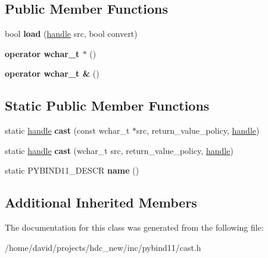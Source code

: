 \subsection*{Public Member Functions}
\begin{DoxyCompactItemize}
\item 
bool {\bfseries load} (\hyperlink{classhandle}{handle} src, bool convert)\hypertarget{classtype__caster_3_01wchar__t_01_4_aea440f06e3dc0dbc2ed7690204198866}{}\label{classtype__caster_3_01wchar__t_01_4_aea440f06e3dc0dbc2ed7690204198866}

\item 
{\bfseries operator wchar\+\_\+t $\ast$} ()\hypertarget{classtype__caster_3_01wchar__t_01_4_ad9ccce957d0f1f0430ae727b7f5864ea}{}\label{classtype__caster_3_01wchar__t_01_4_ad9ccce957d0f1f0430ae727b7f5864ea}

\item 
{\bfseries operator wchar\+\_\+t \&} ()\hypertarget{classtype__caster_3_01wchar__t_01_4_a784ac8a77d7ecaac63da1472fc525c70}{}\label{classtype__caster_3_01wchar__t_01_4_a784ac8a77d7ecaac63da1472fc525c70}

\end{DoxyCompactItemize}
\subsection*{Static Public Member Functions}
\begin{DoxyCompactItemize}
\item 
static \hyperlink{classhandle}{handle} {\bfseries cast} (const wchar\+\_\+t $\ast$src, return\+\_\+value\+\_\+policy, \hyperlink{classhandle}{handle})\hypertarget{classtype__caster_3_01wchar__t_01_4_a224696f336d960d720ee30222cf8bb55}{}\label{classtype__caster_3_01wchar__t_01_4_a224696f336d960d720ee30222cf8bb55}

\item 
static \hyperlink{classhandle}{handle} {\bfseries cast} (wchar\+\_\+t src, return\+\_\+value\+\_\+policy, \hyperlink{classhandle}{handle})\hypertarget{classtype__caster_3_01wchar__t_01_4_a636db4df415297667e2d3bf2d6879d46}{}\label{classtype__caster_3_01wchar__t_01_4_a636db4df415297667e2d3bf2d6879d46}

\item 
static P\+Y\+B\+I\+N\+D11\+\_\+\+D\+E\+S\+CR {\bfseries name} ()\hypertarget{classtype__caster_3_01wchar__t_01_4_a741a4189befeba7383338005c1988b2f}{}\label{classtype__caster_3_01wchar__t_01_4_a741a4189befeba7383338005c1988b2f}

\end{DoxyCompactItemize}
\subsection*{Additional Inherited Members}


The documentation for this class was generated from the following file\+:\begin{DoxyCompactItemize}
\item 
/home/david/projects/hdc\+\_\+new/inc/pybind11/cast.\+h\end{DoxyCompactItemize}
